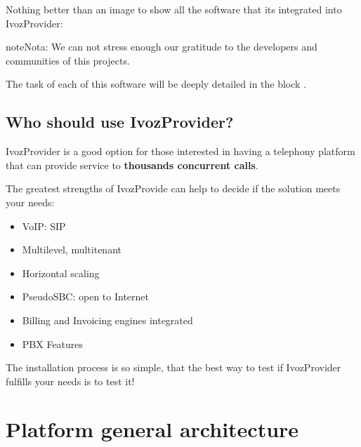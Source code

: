 \documentclass[letterpaper,10pt,spanish]{sphinxmanual}
\begin{document}
Nothing better than an image to show all the software that its integrated
into IvozProvider:


\begin{notice}{note}{Nota:}
We can not stress enough our gratitude to the developers and communities
of this projects.
\end{notice}

The task of each of this software will be deeply detailed in the block
{\hyperref[basic_concepts/architecture/index:architecture]{}}.


\section{Who should use IvozProvider?}
\label{basic_concepts/intro/use_cases::doc}\label{basic_concepts/intro/use_cases:who-should-use-ivozprovider}
IvozProvider is a good option for those interested in having a telephony
platform that can provide service to \textbf{thousands concurrent calls}.

The greatest strengths of IvozProvide can help to decide if the solution
meets your needs:
\begin{itemize}
\item {} 
VoIP: SIP

\item {} 
Multilevel, multitenant

\item {} 
Horizontal scaling

\item {} 
PseudoSBC: open to Internet

\item {} 
Billing and Invoicing engines integrated

\item {} 
PBX Features

\end{itemize}

The installation process is so simple, that the best way to test if
IvozProvider fulfills your needs is to test it!


\chapter{Platform general architecture}
\label{basic_concepts/architecture/index:platform-general-architecture}\label{basic_concepts/architecture/index::doc}\label{basic_concepts/architecture/index:architecture}
\end{document}
